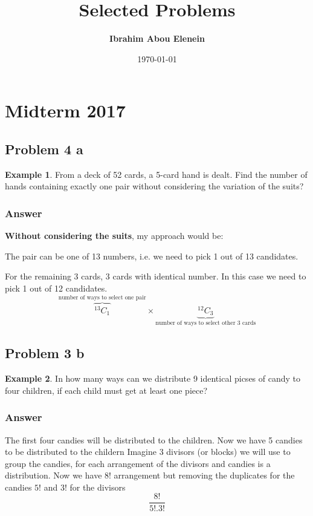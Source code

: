 \documentclass[12pt]{article}
\title{\textbf{Selected Problems}} %
\author{\textbf{Ibrahim Abou Elenein}}
\date{\today} %
\theoremstyle{definition}
\newtheorem{exmp}{Example}[section]
\newcommand*{\Comb}[2]{{}^{#1}C_{#2}}%
\begin{document}
\setlength{\droptitle}{-5em}    
\maketitle
\section{Midterm  2017} 
\subsection{Problem 4 a}
\begin{exmp}
    From a deck of 52 cards, a 5-card hand is dealt. Find the number of
    hands containing exactly one pair without considering the variation
    of the suits?

    \subsubsection{Answer}
    \textbf{Without considering the suits}, my approach would be:

    The pair can be one of 13 numbers, i.e. we need to pick 1 out of 13 candidates.

    For the remaining 3 cards, 3 cards with identical number. In this case we need to pick 1 out of 12 candidates.
    \[
        \overbrace{\Comb{13}{1}}^{\text{number of ways to select one pair}}
        \times \underbrace{\Comb{12}{3}}_{\text{number of ways to select other 3 cards}}
    \]
\end{exmp}
\subsection{Problem 3 b}
\begin{exmp}
    In how many ways can we distribute 9 identical picses of candy
    to four children, if each child must get at least one piece?
    \subsubsection{Answer}
    The first four candies will be distributed to the children.
    Now we have 5 candies to be distributed to the childern
    Imagine 3 divisors (or blocks) we will use to group the candies,
    for each arrangement of the divisors and candies is a distribution.
    Now we have $8!$ arrangement but removing the duplicates for the
    candies $5!$ and $3!$ for the divisors 
    \[
        \frac{8!}{5!.3!}
    \]
\end{exmp}
\end{document}
